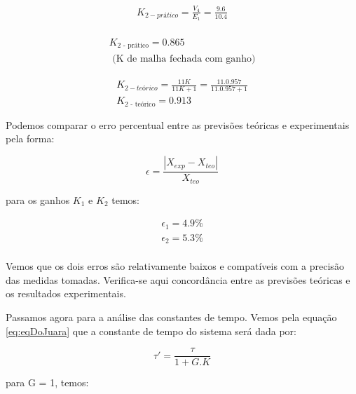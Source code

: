 \begin{equation}
\begin{array}{l}
    K_{2 - prático} = \frac{V_4}{E_1} = \frac{9.6}{10.4}\\
\end{array}
\end{equation}

\begin{equation}
\begin{array}{c}
\boxed{K_{\mbox{2 - prático}} = 0.865} \\ \mbox{ (K de malha fechada com ganho)}
\end{array}
\end{equation}

\begin{equation}
\begin{array}{l}
    K_{2 - teórico} = \frac{11K}{11K+1} = \frac{11 . 0.957}{11 . 0.957 + 1} \\
    \boxed{K_{\mbox{2 - teórico}} = 0.913 }
\end{array}
\end{equation}

Podemos comparar o erro percentual entre as previsões teóricas e experimentais pela forma:

\begin{equation}
  \epsilon = \frac{|X_{exp} - X_{teo}|}{X_{teo}}
\end{equation}

para os ganhos $K_1$ e $K_2$ temos:

\begin{equation}
\begin{array}{l}
    \epsilon_1 = 4.9\% \\
    \epsilon_2 = 5.3\% \\
\end{array}
\end{equation}

Vemos que os dois erros são relativamente baixos e compatíveis com a precisão das medidas tomadas. Verifica-se aqui concordância entre as previsões teóricas e os resultados experimentais.


Passamos agora para a análise das constantes de tempo. Vemos pela equação \ref{eq:eqDoJuara} que a constante de tempo do sistema será dada por:

\begin{equation}
    \tau ' = \frac{\tau}{1 + G.K}
\end{equation}

para G = 1, temos:

